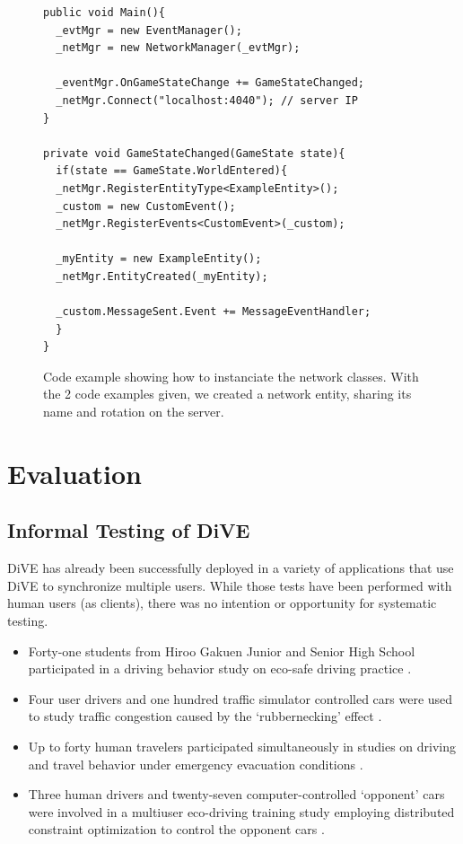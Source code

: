 \documentclass[]{elsarticle}
\begin{document}
\begin{figure}[!hbt]
\centering
\begin{lstlisting}
public void Main(){
  _evtMgr = new EventManager();
  _netMgr = new NetworkManager(_evtMgr);
	
  _eventMgr.OnGameStateChange += GameStateChanged;
  _netMgr.Connect("localhost:4040"); // server IP
}

private void GameStateChanged(GameState state){
  if(state == GameState.WorldEntered){
  _netMgr.RegisterEntityType<ExampleEntity>();
  _custom = new CustomEvent();
  _netMgr.RegisterEvents<CustomEvent>(_custom);
		
  _myEntity = new ExampleEntity();
  _netMgr.EntityCreated(_myEntity);
	
  _custom.MessageSent.Event += MessageEventHandler;
  }
}
\end{lstlisting}
\caption{Code example showing how to instanciate the network classes. With the 2 code examples given, we created a network entity, sharing its name and rotation on the server.}
\label{code2}
\end{figure}

\section{Evaluation}\label{sec:Eval}

\subsection{Informal Testing of DiVE}

DiVE has already been successfully deployed in a variety of applications that use DiVE to synchronize multiple users. While those tests have been performed with human users (as clients), there was no intention or opportunity for systematic testing.

\begin{itemize}
\item Forty-one students from Hiroo Gakuen Junior and Senior High School participated in a driving behavior study on eco-safe driving practice \cite{Madruga+others.2012}.

\item Four user drivers and one hundred traffic simulator controlled cars were used to study traffic congestion caused by the `rubbernecking' effect \cite{Gajananan+others.2013}.

\item Up to forty human travelers participated simultaneously in studies on driving and travel behavior under emergency evacuation conditions \cite{Berg+others.2012}.

\item Three human drivers and twenty-seven computer-controlled `opponent' cars were involved in a multiuser eco-driving training study employing distributed constraint optimization to control the opponent cars \cite{Madruga+Prendinger.2013}.
\end{itemize}
\end{document}

